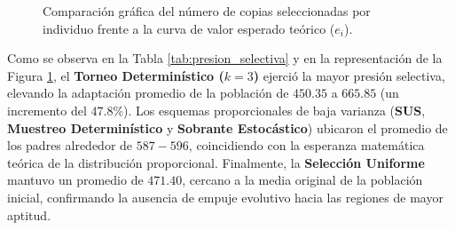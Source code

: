 \documentclass[11pt,letterpaper]{article}
\begin{document}
\begin{figure}[H]
    \centering
    \caption{Comparación gráfica del número de copias seleccionadas por individuo frente a la curva de valor esperado teórico ($e_i$).}
    \label{fig:panel_seleccion}
\end{figure}

Como se observa en la Tabla \ref{tab:presion_selectiva} y en la representación de la Figura \ref{fig:panel_seleccion}, el \textbf{Torneo Determinístico ($k=3$)} ejerció la mayor presión selectiva, elevando la adaptación promedio de la población de $450.35$ a $665.85$ (un incremento del $47.8\%$). Los esquemas proporcionales de baja varianza (\textbf{SUS}, \textbf{Muestreo Determinístico} y \textbf{Sobrante Estocástico}) ubicaron el promedio de los padres alrededor de $587 - 596$, coincidiendo con la esperanza matemática teórica de la distribución proporcional. Finalmente, la \textbf{Selección Uniforme} mantuvo un promedio de $471.40$, cercano a la media original de la población inicial, confirmando la ausencia de empuje evolutivo hacia las regiones de mayor aptitud.

\end{document}
